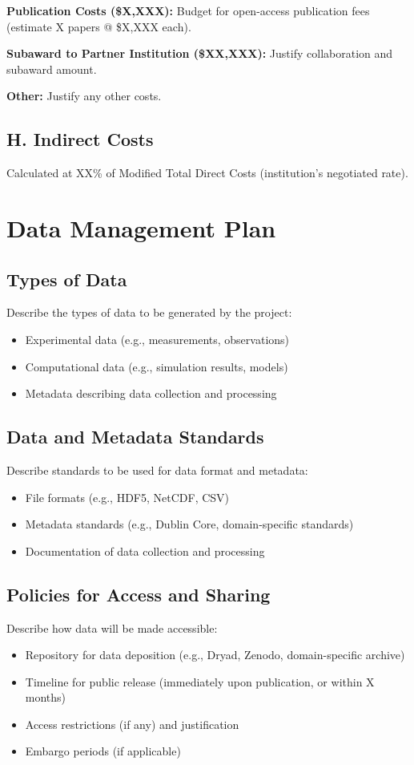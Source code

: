 \documentclass[11pt,letterpaper]{article}
\begin{document}
\textbf{Publication Costs (\$X,XXX):} Budget for open-access publication fees (estimate X papers @ \$X,XXX each).

\textbf{Subaward to Partner Institution (\$XX,XXX):} Justify collaboration and subaward amount.

\textbf{Other:} Justify any other costs.

\subsection*{H. Indirect Costs}
Calculated at XX\% of Modified Total Direct Costs (institution's negotiated rate).

\newpage


\section*{Data Management Plan}

\subsection*{Types of Data}
Describe the types of data to be generated by the project:
\begin{itemize}
    \item Experimental data (e.g., measurements, observations)
    \item Computational data (e.g., simulation results, models)
    \item Metadata describing data collection and processing
\end{itemize}

\subsection*{Data and Metadata Standards}
Describe standards to be used for data format and metadata:
\begin{itemize}
    \item File formats (e.g., HDF5, NetCDF, CSV)
    \item Metadata standards (e.g., Dublin Core, domain-specific standards)
    \item Documentation of data collection and processing
\end{itemize}

\subsection*{Policies for Access and Sharing}
Describe how data will be made accessible:
\begin{itemize}
    \item Repository for data deposition (e.g., Dryad, Zenodo, domain-specific archive)
    \item Timeline for public release (immediately upon publication, or within X months)
    \item Access restrictions (if any) and justification
    \item Embargo periods (if applicable)
\end{itemize}
\end{document}
